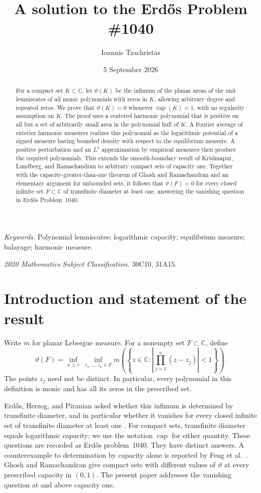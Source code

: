 \documentclass[11pt]{article}
\title{A solution to the Erd\H{o}s Problem \#1040}
\author{Ioannis Tzachristas}
\date{5 September 2026}
\newcommand{\C}{\mathbb C}
\DeclareMathOperator{\caplog}{cap}
\theoremstyle{remark}
\numberwithin{equation}{section}
\begin{document}
\maketitle

\begin{abstract}
For a compact set $K\subset\C$, let $\vartheta(K)$ be the infimum of
the planar areas of the unit lemniscates of all monic polynomials with
zeros in $K$, allowing arbitrary degree and repeated zeros.
We prove that $\vartheta(K)=0$ whenever
$\caplog(K)=1$, with no regularity assumption on $K$.
The proof uses a centered harmonic polynomial that is positive on all
but a set of arbitrarily small area in the polynomial hull of $K$.
A Fourier average of exterior harmonic measures realizes this polynomial
as the logarithmic potential of a signed measure having bounded density
with respect to the equilibrium measure. A positive perturbation and
an $L^1$ approximation by empirical measures then produce the required
polynomials. This extends the smooth-boundary result of Krishnapur,
Lundberg, and Ramachandran to arbitrary compact sets of capacity one.
Together with the capacity-greater-than-one theorem of Ghosh and
Ramachandran and an elementary argument for unbounded sets, it follows
that $\vartheta(F)=0$ for every closed infinite set $F\subset\C$
of transfinite diameter at least one, answering the vanishing question
in Erd\H{o}s Problem~1040.
\end{abstract}

\noindent\textit{Keywords.} Polynomial lemniscates; logarithmic capacity;
equilibrium measure; balayage; harmonic measure.\par
\noindent\textit{2020 Mathematics Subject Classification.} 30C10, 31A15.

\section{Introduction and statement of the result}

Write $m$ for planar Lebesgue measure. For a nonempty set $F\subset\C$,
define
\begin{equation}\label{eq:def}
 \vartheta(F)=\inf_{n\ge1}\ \inf_{z_1,\ldots,z_n\in F}
 m\left(\left\{z\in\C:
       \left|\prod_{j=1}^n(z-z_j)\right|<1\right\}\right).
\end{equation}
The points $z_j$ need not be distinct. In particular, every polynomial
in this definition is monic and has all its zeros in the prescribed set.

Erd\H{o}s, Herzog, and Piranian asked whether this infimum is determined
by transfinite diameter, and in particular whether it vanishes for every
closed infinite set of transfinite diameter at least one
\cite[Problem~4, p.~135]{EHP1958}. For compact sets, transfinite diameter
equals logarithmic capacity; we use the notation $\caplog$ for either
quantity. These questions are recorded as Erd\H{o}s problem~1040.
They have distinct answers. A counterexample to determination by
capacity alone is reported by Feng et al.\ \cite[Section~3.3]{Feng2026}.
Ghosh and Ramachandran \cite[Example~2.1]{GR2026} give compact sets
with different values of $\vartheta$ at every prescribed capacity in
$(0,1)$. The present paper addresses the vanishing question at and
above capacity one.
\end{document}
